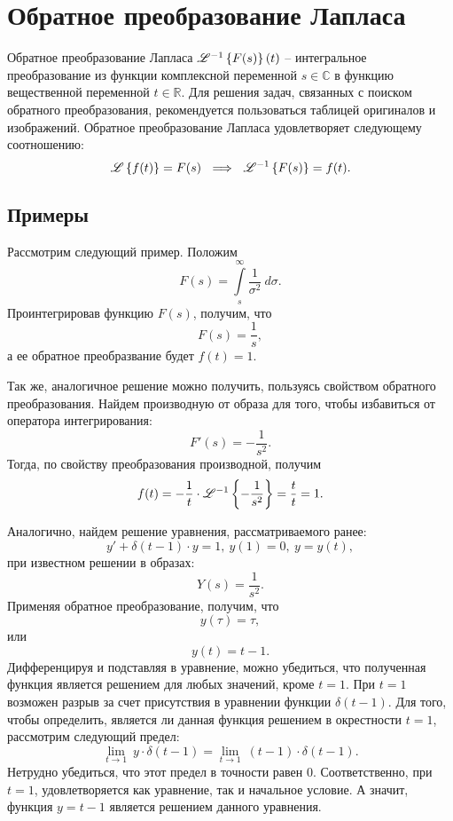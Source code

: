 \section{Обратное преобразование Лапласа}

	Обратное преобразование Лапласа $\mathscr{L}^{-1} \left\lbrace {F(s)} \right\rbrace \left( t \right)$ -- интегральное преобразование из функции комплексной переменной $s \in \mathbb{C}$ в функцию вещественной переменной $t \in \mathbb{R}$. Для решения задач, связанных с поиском обратного преобразования, рекомендуется пользоваться таблицей оригиналов и изображений. Обратное преобразование Лапласа удовлетворяет следующему соотношению:
	\[ \mathscr{L} \left\lbrace {f(t)} \right\rbrace = F(s) ~ \implies ~ \mathscr{L}^{-1} \left\lbrace {F(s)} \right\rbrace = f(t). \]

	\subsection{Примеры}

		Рассмотрим следующий пример. Положим 
		\[ F(s) = \int\limits_{s}^{\infty} \frac{1}{\sigma^2} ~ d \sigma. \] 
		Проинтегрировав функцию $F(s)$, получим, что 
		\[ F(s) = \frac{1}{s}, \] 
		а ее обратное преобразвание будет $f(t) = 1$. 

		\vspace{20pt}

		Так же, аналогичное решение можно получить, пользуясь свойством обратного преобразования. Найдем производную от образа для того, чтобы избавиться от оператора интегрирования: 
		\[ F'(s) = -\frac{1}{s^2}. \] 
		Тогда, по свойству преобразования производной, получим 
		\[ f(t) = -\frac{1}{t} \cdot \mathscr{L}^{-1} \left\lbrace {-\frac{1}{s^2}} \right\rbrace = \frac{t}{t} = 1. \]

		\vspace{20pt}

		Аналогично, найдем решение уравнения, рассматриваемого ранее:
		\[ y' + \delta(t-1) \cdot y = 1, ~ y(1) = 0, ~ y = y(t), \]
		при известном решении в образах:
		\[ Y(s) = \frac{1}{s^2}. \]
		Применяя обратное преобразование, получим, что
		\[ y(\tau) = \tau, \]
		или
		\[ y(t) = t - 1. \]
		Дифференцируя и подставляя в уравнение, можно убедиться, что полученная функция является решением для любых значений, кроме $t = 1$. При $t = 1$ возможен разрыв за счет присутствия в уравнении функции $\delta(t-1)$.
		Для того, чтобы определить, является ли данная функция решением в окрестности $t = 1$, рассмотрим следующий предел: 
		\[ \lim_{t \to 1} ~ y \cdot \delta(t-1) = \lim_{t \to 1} ~ (t-1) \cdot \delta(t-1). \]
		Нетрудно убедиться, что этот предел в точности равен $0$. Соответственно, при $t = 1$, удовлетворяется как уравнение, так и начальное условие. А значит, функция $y = t - 1$ является решением данного уравнения.

